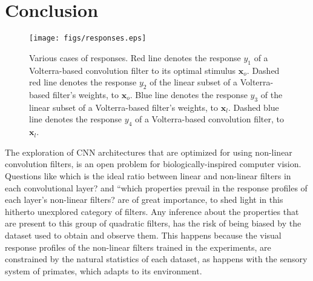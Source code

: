 \documentclass[10pt,twocolumn,letterpaper]{article}
\renewcommand{\vec}[1]{\mathbf{#1}}
\begin{document}



\section{Conclusion}
\label{Conclusion}

\begin{figure*}[t]
  		\centering
  		\texttt{[image: figs/responses.eps]}
  		\caption{Various cases of responses. Red line denotes the response $y_{1}$ of a Volterra-based convolution filter to its optimal stimulus $\vec{x}_o$. Dashed red line denotes the response $y_{2}$ of the linear subset of a Volterra-based filter's weights, to $\vec{x}_o$. Blue line denotes the response $y_{3}$ of the linear subset of a Volterra-based filter's weights, to $\vec{x}_l$. Dashed blue line denotes the response $y_{4}$ of a Volterra-based convolution filter, to $\vec{x}_l$.}
  		\label{fig:resp_plots}
\end{figure*} 

    The exploration of CNN architectures that are optimized for using non-linear convolution filters, is an open problem for biologically-inspired computer vision. Questions like which is the ideal ratio between linear and non-linear filters in each convolutional layer? and ``which properties prevail in the response profiles of each layer's non-linear filters? are of great importance, to shed light in this hitherto unexplored category of filters. Any inference about the properties that are present to this group of quadratic filters, has the risk of being biased by the dataset used to obtain and observe them. This happens because the visual response profiles of the non-linear filters trained in the experiments, are constrained by the natural statistics of each dataset, as happens with the sensory system of primates, which adapts to its environment.
\end{document}
